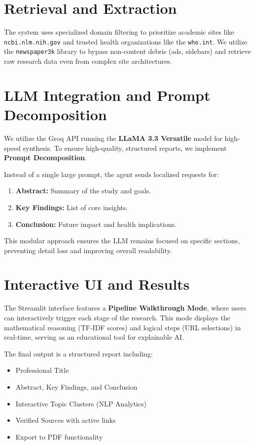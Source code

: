 \documentclass[12pt,a4paper]{article}
\begin{document}
\section{Retrieval and Extraction}
The system uses specialized domain filtering to prioritize academic sites like \texttt{ncbi.nlm.nih.gov} and trusted health organizations like the \texttt{who.int}. We utilize the \texttt{newspaper3k} library to bypass non-content debris (ads, sidebars) and retrieve raw research data even from complex site architectures.

\section{LLM Integration and Prompt Decomposition}
We utilize the Groq API running the \textbf{LLaMA 3.3 Versatile} model for high-speed synthesis. To ensure high-quality, structured reports, we implement \textbf{Prompt Decomposition}. 

Instead of a single large prompt, the agent sends localized requests for:
\begin{enumerate}
    \item \textbf{Abstract:} Summary of the study and goals.
    \item \textbf{Key Findings:} List of core insights.
    \item \textbf{Conclusion:} Future impact and health implications.
\end{enumerate}
This modular approach ensures the LLM remains focused on specific sections, preventing detail loss and improving overall readability.

\section{Interactive UI and Results}
The Streamlit interface features a \textbf{Pipeline Walkthrough Mode}, where users can interactively trigger each stage of the research. This mode displays the mathematical reasoning (TF-IDF scores) and logical steps (URL selections) in real-time, serving as an educational tool for explainable AI.

The final output is a structured report including:
\begin{itemize}
    \item Professional Title
    \item Abstract, Key Findings, and Conclusion
    \item Interactive Topic Clusters (NLP Analytics)
    \item Verified Sources with active links
    \item Export to PDF functionality
\end{itemize}
\end{document}
